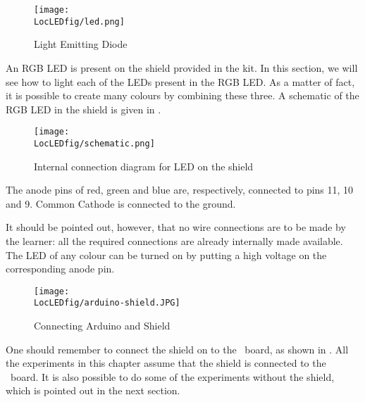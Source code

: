 \begin{figure}
\centering
\texttt{[image: \\LocLEDfig/led.png]}
\caption{Light Emitting Diode}
\label{fig:ledsym}
\end{figure}

An RGB LED is present on the shield provided in the kit.  In this
section, we will see how to light each of the LEDs present in the RGB
LED.  As a matter of fact, it is possible to create many colours by
combining these three.  A schematic of the RGB LED in the shield is
given in .
\begin{figure}
\centering
\texttt{[image: \\LocLEDfig/schematic.png]}
\caption{Internal connection diagram for LED on the shield}
\label{fig:ledblock}
\end{figure}
The anode pins of red, green and blue are, respectively, connected to
pins 11, 10 and 9.  Common Cathode is connected to the ground.

It should be pointed out, however, that no wire connections are to be
made by the learner: all the required connections are already
internally made available.  The LED of any colour can be turned on by
putting a high voltage on the corresponding anode pin.

\begin{figure}
\centering
\texttt{[image: \\LocLEDfig/arduino-shield.JPG]}
\caption{Connecting Arduino and Shield}
\label{fig:uno-shield-connect}
\end{figure}

One should remember to connect the shield on to the \arduino\ board, as
shown in . All the experiments in this
chapter assume that the shield is connected to the \arduino\ board.
It is also possible to do some of the experiments without the shield,
which is pointed out in the next section.

